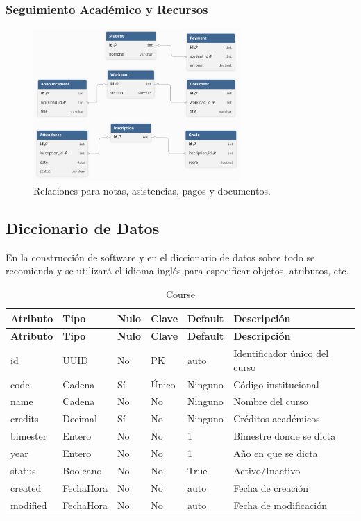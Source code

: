 \documentclass{article}
\begin{document}
        \subsubsection{Seguimiento Académico y Recursos}
            \begin{figure}[H]
                \centering
                \includegraphics[width=0.7\textwidth]{images/RI3.png}
                \caption{Relaciones para notas, asistencias, pagos y documentos.}
            \end{figure}
    \subsection{Diccionario de Datos}
        En la construcción de software y en el diccionario de datos sobre todo se recomienda y se utilizará el idioma inglés para especificar objetos, atributos, etc.
       
\begin{longtable}{|l|l|l|l|l|l|}
\caption{Course} \\
\hline
\rowcolor{tabledictionariesbackground}
\textbf{Atributo} & \textbf{Tipo} & \textbf{Nulo} & \textbf{Clave} & \textbf{Default} & \textbf{Descripción} \\
\hline
\endfirsthead
\hline
\rowcolor{tabledictionariesbackground}
\textbf{Atributo} & \textbf{Tipo} & \textbf{Nulo} & \textbf{Clave} & \textbf{Default} & \textbf{Descripción} \\
\hline
\endhead
id & UUID & No & PK & auto & Identificador único del curso \\
code & Cadena & Sí & Único & Ninguno & Código institucional \\
name & Cadena & No & No & Ninguno & Nombre del curso \\
credits & Decimal & Sí & No & Ninguno & Créditos académicos \\
bimester & Entero & No & No & 1 & Bimestre donde se dicta \\
year & Entero & No & No & 1 & Año en que se dicta \\
status & Booleano & No & No & True & Activo/Inactivo \\
created & FechaHora & No & No & auto & Fecha de creación \\
modified & FechaHora & No & No & auto & Fecha de modificación \\
\hline
\end{longtable}
\end{document}
